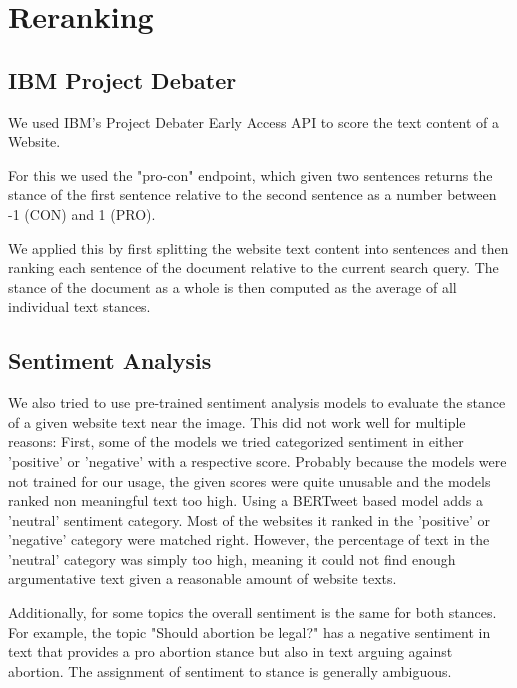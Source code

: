\section{Reranking}

\subsection{IBM Project Debater}

We used IBM's Project Debater Early Access API to score the text content of a Website.

For this we used the "pro-con" endpoint, which given two sentences returns the stance of the first sentence relative to the second sentence as a number between -1 (CON) and 1 (PRO).

We applied this by first splitting the website text content into sentences and then ranking each sentence of the document relative to the current search query. The stance of the document as a whole is then computed as the average of all individual text stances.

\subsection{Sentiment Analysis}%

We also tried to use pre-trained sentiment analysis models to evaluate the stance of a given website text near the image. This did not work well for multiple reasons: First, some of the models we tried categorized sentiment in either 'positive' or 'negative' with a respective score. Probably because the models were not trained for our usage, the given scores were quite unusable and the models ranked non meaningful text too high. Using a BERTweet based model\cite{bertweet}\cite{perez2021pysentimiento} adds a 'neutral' sentiment category. Most of the websites it ranked in the 'positive' or 'negative' category were matched right. However, the percentage of text in the 'neutral' category was simply too high, meaning it could not find enough argumentative text given a reasonable amount of website texts.

Additionally, for some topics the overall sentiment is the same for both stances. For example, the topic "Should abortion be legal?" has a negative sentiment in text that provides a pro abortion stance but also in text arguing against abortion. The assignment of sentiment to stance is generally ambiguous.

